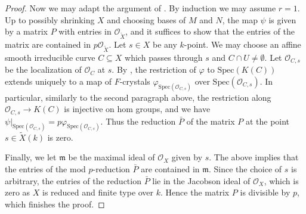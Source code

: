 \documentclass[11pt, letterpaper]{amsart}
\theoremstyle{plain}
\theoremstyle{definition}
\newcommand{\Spec}{\mathrm{Spec}}
\newcommand{\<}{\langle}
\renewcommand{\>}{\rangle}
\newcommand{\fm}{\mathfrak{m}}
\newcommand{\sO}{\mathcal{O}}
\begin{document}
\begin{proof}
	Now we may adapt the argument of \cite[Lem.~6.15]{Maulik}. By induction we may assume $r = 1$. 
	Up to possibly shrinking $X$ and choosing bases of $M$ and $N$, the map $\psi$ is given by a matrix $P$ with entries in $\sO_{\tilde{X}}$, and
	it suffices to show that the entries of the matrix are contained in $p\sO_{\tilde{X}}$. 
	Let $s \in X$ be any $k$-point. 
	We may choose an affine smooth irreducible curve $C \subseteq X$ which passes through $s$ and $C \cap U \neq \emptyset$. 
	Let $\sO_{C, s}$ be the localization of $\sO_C$ at $s$. 
	By \cite[Cor.~1.2]{deJong}, the restriction of $\varphi$ to $\Spec(K(C))$ extends uniquely to a map of $F$-crystals $\varphi_{\Spec(\sO_{C,s})}$ over $\Spec(\sO_{C, s})$. 
	In particular, similarly to the second paragraph above, the restriction along $\sO_{C,s} \to K(C)$ is injective on hom groups, and we have $\psi|_{\Spec(\sO_{C,s})} = p\varphi_{\Spec(\sO_{C,s})}$.
	Thus the reduction $\bar{P}$ of the matrix $P$ at the point $s\in \tilde{X}(k)$ is zero.
	
	Finally, we let $\fm$ be the maximal ideal of $\sO_{X}$ given by $s$.
	The above implies that the entries of the mod $p$-reduction $\bar{P}$ are contained in $\fm$. 
	Since the choice of $s$ is arbitrary, the entries of the reduction $\bar{P}$ lie in the Jacobson ideal of $\sO_X$, which is zero as $X$ is reduced and finite type over $k$. 
	Hence the matrix $P$ is divisible by $p$, which finishes the proof.
\end{proof}
\end{document}
